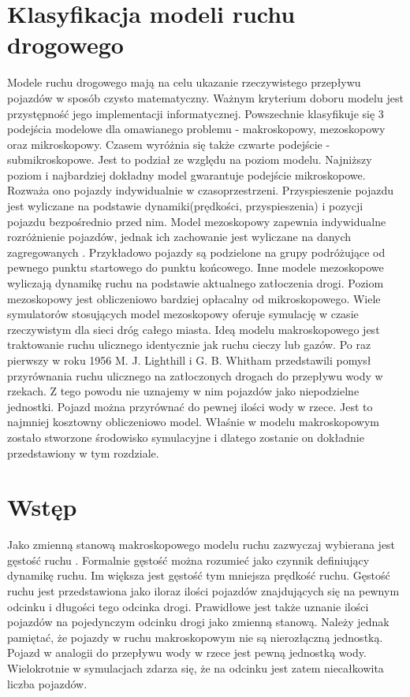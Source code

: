 \documentclass[12pt]{book}
\theoremstyle{plain}
\begin{document}
\section{Klasyfikacja modeli ruchu drogowego}
Modele ruchu drogowego mają na celu ukazanie rzeczywistego przepływu pojazdów w sposób czysto matematyczny. Ważnym kryterium doboru modelu jest przystępność jego implementacji informatycznej. Powszechnie klasyfikuje się 3 podejścia modelowe dla omawianego problemu \cite{CompareModels} - makroskopowy, mezoskopowy oraz mikroskopowy. Czasem \cite{multilevel} wyróżnia się także czwarte podejście - submikroskopowe. Jest to podział ze względu na poziom modelu. Najniższy poziom i najbardziej dokładny model gwarantuje podejście mikroskopowe. Rozważa ono pojazdy indywidualnie w czasoprzestrzeni. Przyspieszenie pojazdu jest wyliczane na podstawie dynamiki(prędkości, przyspieszenia) i pozycji pojazdu bezpośrednio przed nim. Model mezoskopowy zapewnia indywidualne rozróżnienie pojazdów, jednak ich zachowanie jest wyliczane na danych zagregowanych \cite{mesoscopic}. Przykładowo pojazdy są podzielone na grupy podróżujące od pewnego punktu startowego do punktu końcowego. Inne modele \cite{mesoscopic2} mezoskopowe wyliczają dynamikę ruchu na podstawie aktualnego zatłoczenia drogi. Poziom mezoskopowy jest obliczeniowo bardziej opłacalny od mikroskopowego.
Wiele symulatorów stosujących model mezoskopowy oferuje symulację w czasie rzeczywistym dla sieci dróg całego miasta\cite{vu2017high}. Ideą modelu makroskopowego jest traktowanie ruchu ulicznego identycznie jak ruchu cieczy lub gazów. Po raz pierwszy w roku 1956 M. J. Lighthill i G. B. Whitham \cite{lwr} przedstawili pomysł przyrównania ruchu ulicznego na zatłoczonych drogach do przepływu wody w rzekach. Z tego powodu nie uznajemy w nim pojazdów jako niepodzielne jednostki. Pojazd można przyrównać do pewnej ilości wody w rzece.
Jest to najmniej kosztowny obliczeniowo model. Właśnie w modelu makroskopowym zostało stworzone środowisko symulacyjne i dlatego zostanie on dokładnie przedstawiony w tym rozdziale.

\section{Wstęp}
Jako zmienną stanową makroskopowego modelu ruchu zazwyczaj wybierana jest gęstość ruchu \cite{gottlich,CompareModels}. Formalnie gęstość można rozumieć jako czynnik definiujący dynamikę ruchu. Im większa jest gęstość tym mniejsza prędkość ruchu. Gęstość ruchu \cite{helbing2001master} jest przedstawiona jako iloraz ilości pojazdów znajdujących się na pewnym odcinku i długości tego odcinka drogi. Prawidłowe jest także uznanie ilości pojazdów na pojedynczym odcinku drogi jako zmienną stanową. Należy jednak pamiętać, że pojazdy w ruchu makroskopowym nie są nierozłączną jednostką. Pojazd w analogii do przepływu wody w rzece jest pewną jednostką wody. Wielokrotnie w symulacjach zdarza się, że na odcinku jest zatem niecałkowita liczba pojazdów.
\end{document}
